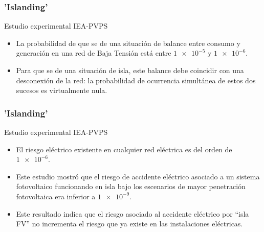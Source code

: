 \documentclass[serif, xcolor=dvipsnames]{beamer}
\begin{document}
\begin{frame}
  \frametitle{'Islanding'}
  \begin{block} {Estudio experimental IEA-PVPS}
    \begin{itemize}
    \item La probabilidad de que se de una situación de balance entre
      consumo y generación en una red de Baja Tensión está entre
      $\num{1e-5}$ y $\num{1e-6}$.
    \item Para que se de una situación de isla, este balance debe
      coincidir con una desconexión de la red: la probabilidad de
      ocurrencia simultánea de estos dos sucesos es virtualmente nula.
    \end{itemize}
  \end{block}

\end{frame}
\begin{frame}
  \frametitle{'Islanding'}
  \begin{block} {Estudio experimental IEA-PVPS}
    \begin{itemize}
    \item El riesgo eléctrico existente en cualquier red eléctrica es
      del orden de $\num{1e-6}$.
    \item Este estudio mostró que el riesgo de accidente eléctrico
      asociado a un sistema fotovoltaico funcionando en isla bajo los
      escenarios de mayor penetración fotovoltaica era inferior a
      $\num{1e-9}$.
    \item Este resultado indica que el riesgo asociado al accidente
      eléctrico por \textquotedblleft{}isla FV\textquotedblright{} no
      incrementa el riesgo que ya existe en las instalaciones
      eléctricas.
    \end{itemize}
  \end{block}

\end{frame}
\end{document}
